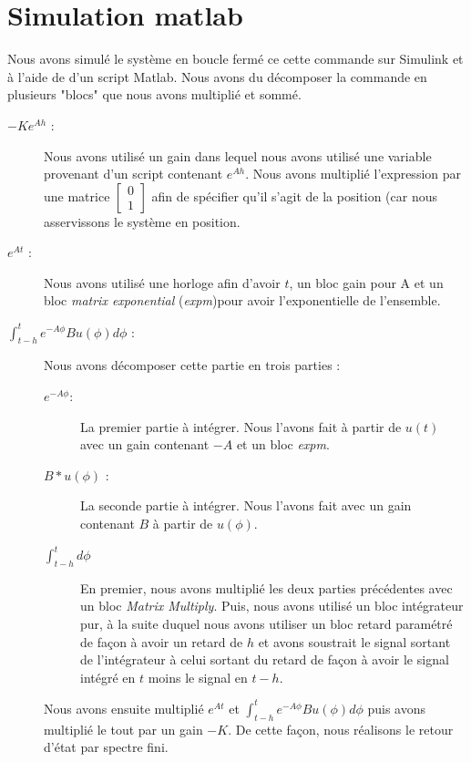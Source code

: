 \section{Simulation matlab}
Nous avons simulé le système en boucle fermé ce cette commande sur Simulink et à l'aide de d'un script Matlab. 
Nous avons du décomposer la commande en plusieurs "blocs" que nous avons multiplié et sommé. \\
\begin{description}
\item[$-Ke^{Ah}$ :] Nous avons utilisé un gain dans lequel nous avons utilisé une variable provenant d'un script contenant $e^{Ah}$. Nous avons multiplié l'expression par une matrice $\begin{bmatrix}
0\\
1
\end{bmatrix} $ afin de spécifier qu'il s'agit de la position (car nous asservissons le système en position.
\item[$ e^{At} $ :]  Nous avons utilisé une horloge afin d'avoir $t$, un bloc gain pour A et un bloc \emph{matrix exponential} (\emph{expm})pour avoir l'exponentielle de l'ensemble.
\item[$\int_{t-h}^{t} e^{-A \phi} Bu(\phi)d\phi $ :] Nous avons décomposer cette partie en trois parties : 
\begin{description}
\item[$ e^{-A\phi} $:] La premier partie à intégrer. Nous l'avons fait à partir de $u(t)$ avec un gain contenant $-A$  et un bloc \emph{expm}.
\item[$B*u(\phi)  $ :] La seconde partie à intégrer. Nous l'avons  fait avec un gain contenant $B$ à partir de $u(\phi)$. 
\item[$\int_{t-h}^{t} d\phi $ ] En premier, nous avons multiplié les deux parties précédentes avec un bloc \emph{Matrix Multiply}. Puis, nous avons utilisé un bloc intégrateur pur, à la suite duquel nous avons utiliser un bloc retard paramétré de façon à avoir un retard de $h$ et avons soustrait le signal sortant de l'intégrateur à celui sortant du retard de façon à avoir le signal intégré en $t$ moins le signal en $t-h$.
\end{description}
\item[] Nous avons ensuite multiplié $ e^{At}$ et $\int_{t-h}^{t} e^{-A \phi} Bu(\phi)d\phi $ puis avons multiplié le tout par un gain $-K$. De cette façon, nous réalisons le retour d'état par spectre fini.
\end{description}

